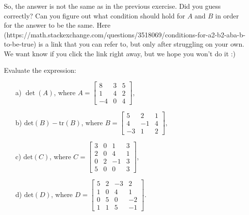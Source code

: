 \begin{sol}
\begin{enumerate}
        So, the answer is not the same as in the previous exercise. Did you guess correctly? Can you figure out what condition should hold for $A$ and $B$ in order for the answer to be the same. Here (https://math.stackexchange.com/questions/3518069/conditions-for-a2-b2-aba-b-to-be-true) is a link that you can refer to, but only after struggling on your own. We want know if you click the link right away, but we hope you won't do it :)
    \end{enumerate}
\end{sol}


\newpage

\begin{problem}[2 points]
    Evaluate the expression:

    \begin{enumerate}
        \item[a) ] $\det(A)$, where $A=\begin{bmatrix}
        8&3&5\\1&4&2\\-4&0&4   \end{bmatrix}$,

        \item[b) ] $\text{det}(B)-\text{tr}(B)$, where $B=\begin{bmatrix}
        5&2&1\\4&-1&4\\-3&1&2 \end{bmatrix}$,
        
        \item[c) ] $\text{det}(C)$, where $C=\begin{bmatrix}
        3&0&1&3\\2&0&4&1\\0&2&-1&3\\5&0&0&3   \end{bmatrix}$,
        
        \item[d) ] $\text{det}(D)$, where $D=\begin{bmatrix}
        5&2&-3&2\\1&0&4&1\\0&5&0&-2\\1&1&5&-1  \end{bmatrix}$.
    \end{enumerate}
\end{problem}

